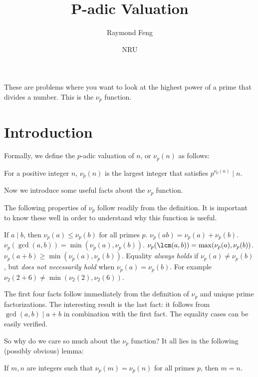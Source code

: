 \documentclass[mast]{lucky}
\title{P-adic Valuation}
\author{Raymond Feng}
\date{NRU}
\begin{document}
\maketitle

These are problems where you want to look at the highest power of a prime that divides a number. This is the $\nu_p$ function. 

\section{Introduction}
Formally, we define the $p$-adic valuation of $n$, or $\nu_p(n)$ as follows:
\begin{defi}
    For a positive integer $n$, $\nu_p(n)$ is the largest integer that satisfies $p^{\nu_p(n)}\mid n$.
\end{defi}

Now we introduce some useful facts about the $\nu_p$ function.

\begin{fact}[Properties of $\nu_p$]
    The following properties of $\nu_p$ follow readily from the definition. It is important to know these well in order to understand why this function is useful.
    \begin{itemize}
        \Item If $a\mid b$, then $\nu_p(a)\leq\nu_p(b)$ for all primes $p$.
        \Item $\nu_p(ab)=\nu_p(a)+\nu_p(b)$.
        \Item $\nu_p(\gcd(a,b))=\min(\nu_p(a),\nu_p(b))$.
        \Item $\nu_p(\lcm(a,b))=\max(\nu_p(a),\nu_p(b))$.
        \Item $\nu_p(a+b)\geq\min(\nu_p(a),\nu_p(b))$. Equality \emph{always holds} if $\nu_p(a)\neq\nu_p(b)$, but \emph{does not necessarily hold} when $\nu_p(a)=\nu_p(b)$. For example $\nu_2(2+6)\neq\min(\nu_2(2),\nu_2(6))$.
    \end{itemize}
\end{fact}

\begin{pro}
    The first four facts follow immediately from the definition of $\nu_p$ and unique prime factorizations. The interesting result is the last fact: it follows from $\gcd(a,b)\mid a+b$ in combination with the first fact. The equality cases can be easily verified.
\end{pro}

So why do we care so much about the $\nu_p$ function? It all lies in the following (possibly obvious) lemma:

\begin{lemma}
    If $m,n$ are integers such that $\nu_p(m)=\nu_p(n)$ for all primes $p$, then $m=n$.
\end{lemma}
\end{document}
